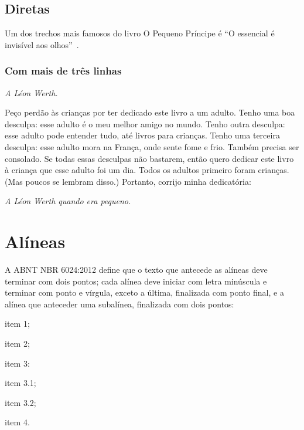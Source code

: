 \documentclass[serif, brazilian]{uffstex}
\begin{document}
\section{Diretas}

Um dos trechos mais famosos do livro O Pequeno Príncipe é \enquote{O essencial é invisível aos olhos}~\cite[58]{exupery15}.

\subsection{Com mais de três linhas}

\begin{citacao}
\textit{A Léon Werth.}

Peço perdão às crianças por ter dedicado este livro a um adulto. Tenho uma boa desculpa: esse adulto é o meu melhor amigo no mundo. Tenho outra desculpa: esse adulto pode entender tudo, até livros para crianças. Tenho uma terceira desculpa: esse adulto mora na França, onde sente fome e frio. Também precisa ser consolado. Se todas essas desculpas não bastarem, então quero dedicar este livro à criança que esse adulto foi um dia. Todos os adultos primeiro foram crianças. (Mas poucos se lembram disso.) Portanto, corrijo minha dedicatória:

\textit{A Léon Werth quando era pequeno.}~\cite{exupery15}
\end{citacao}

\chapter{Alíneas}

A ABNT NBR 6024:2012 define que o texto que antecede as alíneas deve terminar com dois pontos; cada alínea deve iniciar com letra minúscula e terminar com ponto e vírgula, exceto a última, finalizada com ponto final, e a alínea que anteceder uma subalínea, finalizada com dois pontos:

\begin{alineas}
  \item item 1;
  \item item 2;
  \item item 3:
  \begin{alineas} %
    \item item 3.1;
    \item item 3.2;
  \end{alineas}
  \item item 4.
\end{alineas}
\end{document}
